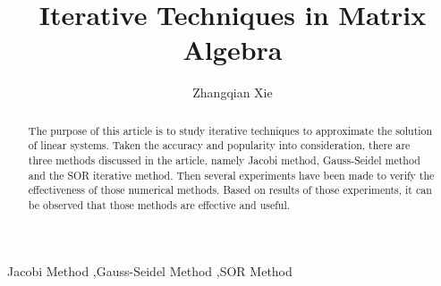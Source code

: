 \documentclass[preprint,12pt]{elsarticle}
\begin{document}
\begin{frontmatter}


\title{Iterative Techniques in Matrix Algebra}




\author{Zhangqian Xie}

\address{No.201600020098, Shandong University}

\begin{abstract}
The purpose of this article is to study iterative techniques to approximate the solution of linear systems. Taken the accuracy and popularity into consideration, there are three methods discussed in the article, namely Jacobi method, Gauss-Seidel method and the SOR iterative method. Then several experiments have been made to verify the effectiveness of those numerical methods. Based on results of those experiments, it can be observed that those methods are effective and useful.
\end{abstract}

\begin{keyword}
Jacobi Method \sep Gauss-Seidel Method \sep SOR Method


\end{keyword}

\end{frontmatter}

\end{document}
